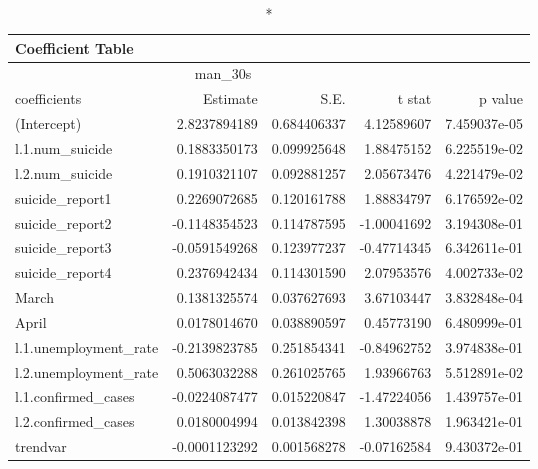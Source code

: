 \begin{longtable}{lrrrr}
\caption*{
{\large Coefficient Table}
} \\ 
\toprule
\multicolumn{4}{c}{man\_30s} &  \\ 
\cmidrule(lr){1-4}
coefficients & Estimate & S.E. & t stat & p value \\ 
\midrule\addlinespace[2.5pt]
(Intercept) & 2.8237894189 & 0.684406337 & 4.12589607 & 7.459037e-05 \\ 
l.1.num\_suicide & 0.1883350173 & 0.099925648 & 1.88475152 & 6.225519e-02 \\ 
l.2.num\_suicide & 0.1910321107 & 0.092881257 & 2.05673476 & 4.221479e-02 \\ 
suicide\_report1 & 0.2269072685 & 0.120161788 & 1.88834797 & 6.176592e-02 \\ 
suicide\_report2 & -0.1148354523 & 0.114787595 & -1.00041692 & 3.194308e-01 \\ 
suicide\_report3 & -0.0591549268 & 0.123977237 & -0.47714345 & 6.342611e-01 \\ 
suicide\_report4 & 0.2376942434 & 0.114301590 & 2.07953576 & 4.002733e-02 \\ 
March & 0.1381325574 & 0.037627693 & 3.67103447 & 3.832848e-04 \\ 
April & 0.0178014670 & 0.038890597 & 0.45773190 & 6.480999e-01 \\ 
l.1.unemployment\_rate & -0.2139823785 & 0.251854341 & -0.84962752 & 3.974838e-01 \\ 
l.2.unemployment\_rate & 0.5063032288 & 0.261025765 & 1.93966763 & 5.512891e-02 \\ 
l.1.confirmed\_cases & -0.0224087477 & 0.015220847 & -1.47224056 & 1.439757e-01 \\ 
l.2.confirmed\_cases & 0.0180004994 & 0.013842398 & 1.30038878 & 1.963421e-01 \\ 
trendvar & -0.0001123292 & 0.001568278 & -0.07162584 & 9.430372e-01 \\ 
\bottomrule
\end{longtable}

